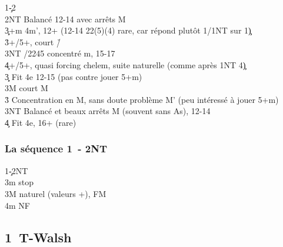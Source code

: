 \documentclass[a4paper]{article}
\begin{document}
\begin{bidtable}
1\c-2\s\+\\
2NT \> Balancé 12-14 avec arrêts M\+\\
3\c\d {}+m 4m', 12+ (12-14 22(5)(4) rare, car répond plutôt 1\s /1NT sur 1\c )\\
3\h\s {}+/5+, court \h /\s \\
3NT /2245 concentré m, 15-17\\
4\c {}+/5+, quasi forcing chelem, suite naturelle (comme après 1NT 4\c )\-\\
3\c\d \> Fit 4e 12-15 (pas contre jouer 5+m)\+\\
3M \> court M\-\\
3\h\s \> Concentration en M, sans doute problème M' (peu intéressé à jouer 5+m)\\
3NT \> Balancé et beaux arrêts M (souvent sans As), 12-14\\
4\c \> Fit 4e, 16+ (rare)\-
\end{bidtable}

\subsubsection{La séquence 1\pdfc\ - 2NT}

\begin{bidtable}
1\c-2NT\+\\
3m \> stop\\
3M \> naturel (valeurs +), FM\\
4m \> NF\-
\end{bidtable}

\subsection{1\pdfd\ T-Walsh}
\end{document}

